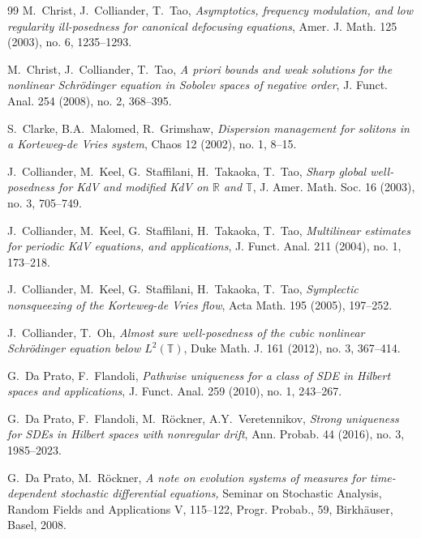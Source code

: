 \documentclass[letterpaper, 11pt,  reqno]{amsart}
\newcommand{\1}{\hspace{0.5mm}\text{I}\hspace{0.5mm}}
\newcommand{\R}{\mathbb{R}}
\newcommand{\T}{\mathbb{T}}
\numberwithin{equation}{section}
\numberwithin{theorem}{section}
\begin{document}
\begin{thebibliography}{99}
M.~Christ, J.~Colliander, T.~Tao,
{\it Asymptotics, frequency modulation, and low regularity ill-posedness for canonical defocusing equations},
Amer. J. Math. 125 (2003), no. 6, 1235--1293.



M.~Christ, J.~Colliander, T.~Tao,
{\it A priori bounds and weak solutions for the nonlinear Schr\"odinger equation in Sobolev spaces of negative order}, J. Funct. Anal. 254 (2008), no. 2, 368--395.


S.~Clarke, B.A.~Malomed, R.~Grimshaw,
{\it Dispersion management for solitons in a Korteweg-de Vries system},
Chaos 12 (2002), no. 1, 8--15.




J.~Colliander, M.~Keel, G.~Staffilani, H.~Takaoka, T.~Tao,
{\it Sharp global well-posedness for KdV and modified KdV on $\R$ and $\T$},
J. Amer. Math. Soc. 16 (2003), no. 3, 705--749.



J.~Colliander, M.~Keel, G.~Staffilani, H.~Takaoka, T.~Tao,
{\it Multilinear estimates for periodic KdV equations, and applications},
J. Funct. Anal. 211 (2004), no. 1, 173--218.


J.~Colliander, M.~Keel, G.~Staffilani, H.~Takaoka, T.~Tao,
{\it Symplectic nonsqueezing of the Korteweg-de Vries flow}, 
Acta Math. 195 (2005), 197--252. 



J.~Colliander, T.~Oh, 
{\it  Almost sure well-posedness of the cubic nonlinear Schr\"odinger equation below $L^2(\T)$}, 
Duke Math. J. 161 (2012), no. 3, 367--414. 


%

G.~Da Prato, F.~Flandoli, 
{\it Pathwise uniqueness for a class of SDE in Hilbert spaces and applications}, 
J. Funct. Anal. 259 (2010), no. 1, 243--267. 

G.~Da Prato, F.~Flandoli, M.~R\"ockner, A.Y.~Veretennikov, 
{\it Strong uniqueness for SDEs in Hilbert spaces with nonregular drift}, 
Ann. Probab. 44 (2016), no. 3, 1985--2023. 



G.~Da Prato, M.~R\"ockner, 
{\it A note on evolution systems of measures for time-dependent stochastic differential equations,}
Seminar on Stochastic Analysis, Random Fields and Applications V, 115--122,
Progr. Probab., 59, Birkh\"auser, Basel, 2008. 


\end{thebibliography}
\end{document}
